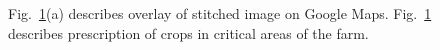 \begin{figure}[!h]
	\hfill
	\hfill
	\hfill
	\caption{\label{fig: scr1andscr2}Fig.~\ref{fig: scr1andscr2}(a) describes overlay of stitched image on Google Maps. Fig.~\ref{fig: scr1andscr2} describes prescription of crops in critical areas of the farm.}
\end{figure}